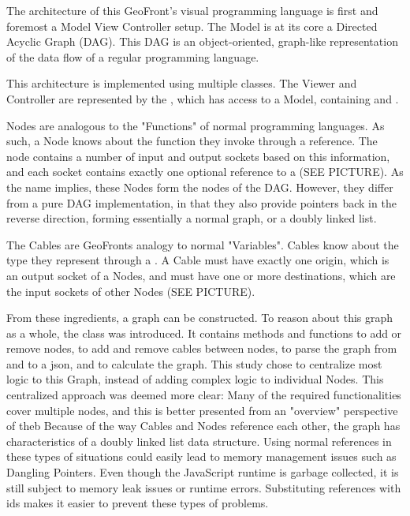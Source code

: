 The architecture of this GeoFront's visual programming language is first and foremost a Model View Controller setup. The Model 
is at its core a Directed Acyclic Graph (DAG). 
This DAG is an object-oriented, graph-like representation of the data flow of a regular programming language. 

This architecture is implemented using multiple classes. The Viewer and Controller are represented by the , which has access to a  Model, containing  and . 

Nodes are analogous to the "Functions" of normal programming languages. 
As such, a Node knows about the function they invoke through a  reference. 
The node contains a number of input and output sockets based on this information, and each socket contains exactly one optional reference to a  (SEE PICTURE).  
As the name implies, these Nodes form the nodes of the DAG. However, they differ from a pure DAG implementation, in that they also provide pointers back in the reverse direction, forming essentially a normal graph, or a doubly linked list. 

The Cables are GeoFronts analogy to normal "Variables". Cables know about the type they represent through a . A Cable must have exactly one origin, which is an output socket of a Nodes, and must have one or more destinations, which are the input sockets of other Nodes (SEE PICTURE).

From these ingredients, a graph can be constructed. 
To reason about this graph as a whole, the  class was introduced. 
It contains methods and functions to add or remove nodes, to add and remove cables between nodes, to parse the graph from and to a json, and to calculate the graph.  
This study chose to centralize most logic to this Graph, instead of adding complex logic to individual Nodes. 
This centralized approach was deemed more clear: Many of the required functionalities cover multiple nodes, and this is better presented from an "overview" perspective of theb 
Because of the way Cables and Nodes reference each other, the graph has characteristics of a doubly linked list data structure. Using normal references in these types of situations could easily lead to memory management issues such as Dangling Pointers. Even though the JavaScript runtime is garbage collected, it is still subject to memory leak issues or runtime errors. Substituting references with ids makes it easier to prevent these types of problems. 

